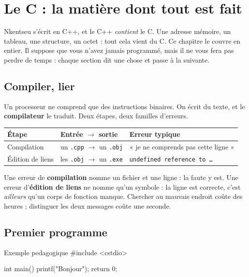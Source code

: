 \chapter{Le C : la matière dont tout est fait}

Nkentseu s'écrit en C++, et le C++ \emph{contient} le C. Une adresse mémoire, un
tableau, une structure, un octet : tout cela vient du C. Ce chapitre le couvre en
entier. Il suppose que vous n'avez jamais programmé, mais il ne vous fera pas
perdre de temps : chaque section dit une chose et passe à la suivante.

\section{Compiler, lier}

Un processeur ne comprend que des instructions binaires. On écrit du texte, et le
\textbf{compilateur} le traduit. Deux étapes, deux familles d'erreurs.

\begin{center}
\begin{tabular}{@{}lll@{}}
\toprule
\textbf{Étape} & \textbf{Entrée $\to$ sortie} & \textbf{Erreur typique} \\
\midrule
Compilation & un \texttt{.cpp} $\to$ un \texttt{.obj} & « je ne comprends pas cette ligne » \\
Édition de liens & les \texttt{.obj} $\to$ un \texttt{.exe} & \texttt{undefined reference to \dots} \\
\bottomrule
\end{tabular}
\end{center}

\begin{nkretenir}
Une erreur de \textbf{compilation} nomme un fichier et une ligne : la faute y
est. Une erreur d'\textbf{édition de liens} ne nomme qu'un symbole : la ligne
est correcte, c'est \emph{ailleurs} qu'un corps de fonction manque. Chercher au
mauvais endroit coûte des heures ; distinguer les deux messages coûte une
seconde.
\end{nkretenir}

\section{Premier programme}

\begin{nkcode}{Exemple pedagogique}
#include <cstdio>

int main() {
    printf("Bonjour\n");
    return 0;
}
\end{nkcode}

